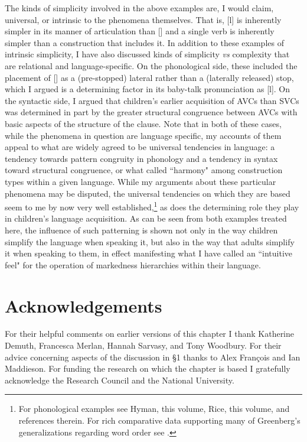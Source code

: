 \documentclass[output=paper]{langsci/langscibook}
\begin{document}
   The kinds of simplicity involved in the above examples are, I would claim, universal, or intrinsic to the phenomena themselves. That is, [l] is inherently simpler in its manner of articulation than [{{\gL}}]  and a single verb is inherently simpler than a construction that includes it. In addition to these examples of intrinsic simplicity, I have also discussed kinds of simplicity \textit{vs} complexity that are relational and language-specific. On the phonological side, these included the placement of [{{\gL}}]  as a (pre-stopped) lateral rather than a (laterally released) stop, which I argued is a determining factor in its baby-talk pronunciation as [l]. On the syntactic side, I argued that  children’s earlier acquisition of AVCs than SVCs was determined in part by the greater structural congruence between AVCs with basic aspects of the structure of the  clause. Note that in both of these cases, while the phenomena in question are language specific, my accounts of them appeal to what are widely agreed to be universal tendencies in language: a tendency towards pattern congruity   in phonology and a tendency in syntax toward structural congruence, or what \citet{greenberg1966universals} called ``harmony" among construction types within a given language.  While my arguments about these particular  phenomena may be disputed, the universal tendencies on which they are based seem to me by now very well established,\footnote{For phonological examples see Hyman, this volume, Rice, this volume, and references therein. For rich comparative data supporting many of Greenberg’s generalizations regarding word order see \citet{Dryer1992greenbergian,Hawkins2014}.} as does the determining role they play in children’s language acquisition.  As can be seen from both examples treated here, the influence of such patterning is shown not only in the way children simplify the language when speaking it, but also in the way that adults simplify it when speaking to them, in effect manifesting what I have called an ``intuitive feel" for the operation of markedness hierarchies within their language.

\section*{Acknowledgements}

For their helpful comments on earlier versions of this chapter I thank Katherine Demuth, Francesca Merlan, Hannah Sarvasy, and Tony Woodbury. For their advice concerning aspects of the discussion in §1 thanks to Alex François and Ian Maddieson. For funding the research on which the chapter is based I gratefully acknowledge the  Research Council and the  National University.
\end{document}
